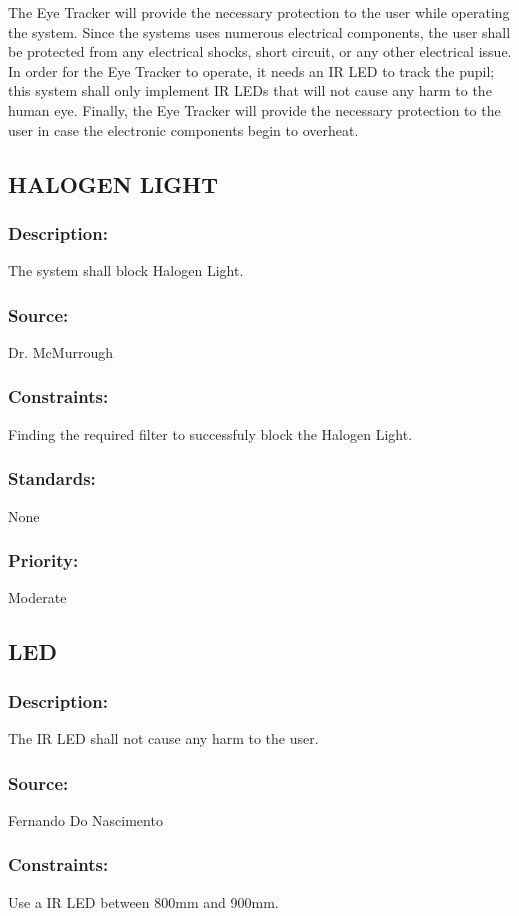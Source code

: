 The Eye Tracker will provide the necessary protection to the user while operating the system. Since the systems uses numerous electrical components, the user shall be protected from any electrical shocks, short circuit, or any other electrical issue. In order for the Eye Tracker to operate, it needs an IR LED to track the pupil; this system shall only implement IR LEDs that will not cause any harm to the human eye. Finally, the Eye Tracker will provide the necessary protection to the user in case the electronic components begin to overheat.

\subsection{\text HALOGEN LIGHT}
\subsubsection{Description:} 
	{The system shall block Halogen Light.}
\subsubsection{Source:} 
	{Dr. McMurrough}
\subsubsection{Constraints:} 
	{Finding the required filter to successfuly block the Halogen Light.}
\subsubsection{Standards:} 
	{None}
\subsubsection{Priority:} 
	{Moderate}
\newline
	
\subsection{\text LED}
\subsubsection{Description:} 
	{The IR LED shall not cause any harm to the user.}
\subsubsection{Source:} 
	{Fernando Do Nascimento}
\subsubsection{Constraints:} 
	{Use a IR LED between 800mm and 900mm.}
